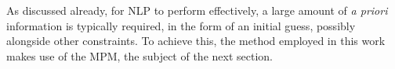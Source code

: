 As discussed already, for \ac{NLP} to perform effectively, a large amount of
\textit{a priori} information is typically required, in the form of an initial
guess, possibly alongside other constraints. To achieve this, the method
employed in this work makes use of the \ac{MPM}, the subject of the next
section.
